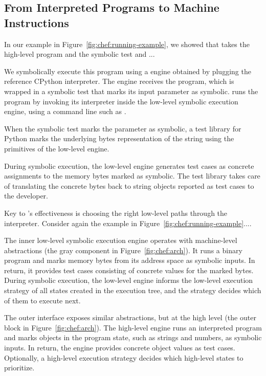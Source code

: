 \subsection{From Interpreted Programs to Machine Instructions}

In our example in Figure~\ref{fig:chef:running-example}, we showed that \chef takes the high-level program and the symbolic test and ...

We symbolically execute this program using a \chef engine obtained by plugging the reference CPython interpreter.
%
The \chef engine receives the program, which is wrapped in a symbolic test that marks its input parameter  as symbolic.
%
\chef runs the program by invoking its interpreter inside the low-level symbolic execution engine, using a command line such as .

When the symbolic test marks the  parameter as symbolic, a \chef test library for Python marks the underlying bytes representation of the string using the primitives of the low-level engine.

During symbolic execution, the low-level engine generates test cases as concrete assignments to the memory bytes marked as symbolic.
%
The \chef test library takes care of translating the concrete bytes back to string objects reported as test cases to the developer.

Key to \chef's effectiveness is choosing the right low-level paths through the interpreter.
%
Consider again the example in Figure~\ref{fig:chef:running-example}....


The inner low-level symbolic execution engine operates with machine-level abstractions (the gray component in Figure~\ref{fig:chef:arch}).
%
It runs a binary program and marks memory bytes from its address space as symbolic inputs.  In return, it provides test cases consisting of concrete values for the marked bytes.
%
During symbolic execution, the low-level engine informs the low-level execution strategy of all states created in the execution tree, and the strategy decides which of them to execute next.

The outer interface exposes similar abstractions, but at the high level (the outer block in Figure~\ref{fig:chef:arch}).
%
The high-level engine runs an interpreted program and marks objects in the program state, such as strings and numbers, as symbolic inputs.  In return, the engine provides concrete object values as test cases.
%
Optionally, a high-level execution strategy decides which high-level states to prioritize.

